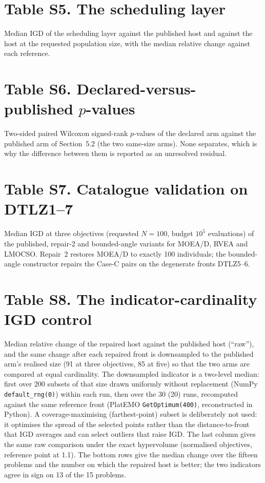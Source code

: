 \documentclass[11pt]{article}
\begin{document}
\section{Table S5. The scheduling layer}


Median IGD of the scheduling layer against the published host and against the host at the requested population size, with the median relative change against each reference.

\section{Table S6. Declared-versus-published $p$-values}


Two-sided paired Wilcoxon signed-rank $p$-values of the declared arm against the published arm of Section~5.2 (the two same-size arms). None separates, which is why the difference between them is reported as an unresolved residual.

\section{Table S7. Catalogue validation on DTLZ1--7}


Median IGD at three objectives (requested $N=100$, budget $10^5$ evaluations) of the published, repair-2 and bounded-angle variants for MOEA/D, RVEA and LMOCSO. Repair~2 restores MOEA/D to exactly 100 individuals; the bounded-angle constructor repairs the Case-C pairs on the degenerate fronts DTLZ5--6.

\clearpage
\section{Table S8. The indicator-cardinality IGD control}


Median relative change of the repaired host against the published host (``raw''), and the same change after each repaired front is downsampled to the published arm's realised size (91 at three objectives, 85 at five) so that the two arms are compared at equal cardinality. The downsampled indicator is a two-level median: first over 200 subsets of that size drawn uniformly without replacement (NumPy \texttt{default\_rng(0)}) within each run, then over the 30 (20) runs, recomputed against the same reference front (PlatEMO \texttt{GetOptimum(400)}, reconstructed in Python). A coverage-maximising (farthest-point) subset is deliberately not used: it optimises the spread of the selected points rather than the distance-to-front that IGD averages and can select outliers that raise IGD. The last column gives the same raw comparison under the exact hypervolume (normalised objectives, reference point at 1.1). The bottom rows give the median change over the fifteen problems and the number on which the repaired host is better; the two indicators agree in sign on 13 of the 15 problems.
\end{document}
